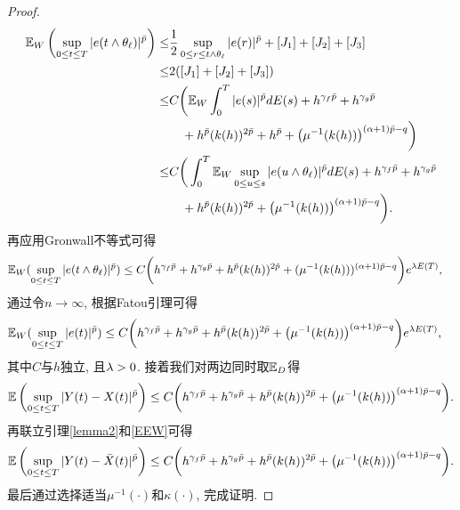 \begin{proof}
\begin{align*}
    \mathbb{E}_W\left(\sup_{0\leq t\leq T}|e( t\wedge\theta_{\ell})|^{\bar{p}}\right)\leq& \frac{1}{2}\sup_{0\leq r\leq t\wedge\theta_{\ell}}|e(r)|^{\bar{p}}+[J_1]+[J_2]+[J_3]\\
    \leq&
    2([J_1]+[J_2]+[J_3])\\
    \leq  &
    C\bigg(\mathbb{E}_{W}\int^{T}_{0}|e(s)|^{\bar{p}}dE(s)+h^{\gamma_f\bar{p}}+h^{\gamma_g\bar{p}}\\
    &\quad+h^{\bar{p}}(k(h))^{2\bar{p}}+h^{\bar{p}}+\big(\mu^{-1}(k(h))\big)^{(\alpha+1)\bar{p}-q}\bigg)\\
    \leq &
    C\bigg(\int^{T}_{0}\mathbb{E}_{W}\sup_{0\leq u\leq s}|e(u\wedge\theta_{\ell} )|^{\bar{p}}dE(s)+h^{\gamma_f\bar{p}}+h^{\gamma_g\bar{p}}\\
    &\quad+h^{\bar{p}}(k(h))^{2\bar{p}}+\big(\mu^{-1}(k(h))\big)^{(\alpha+1)\bar{p}-q}\bigg).
\end{align*}
再应用Gronwall不等式可得
\begin{align*}
    \mathbb{E}_W(\sup_{0\leq t\leq T}|e( t\wedge\theta_{\ell})|^{\bar{p}})
    &\leq 
    C\bigg(h^{\gamma_f\bar{p}}+h^{\gamma_g\bar{p}}
    +h^{\bar{p}}(k(h))^{2\bar{p}}+(\mu^{-1}(k(h)))^{(\alpha+1)\bar{p}-q}\bigg)e^{\lambda E(T)},
\end{align*}
通过令$n\to \infty$, 根据Fatou引理可得
\begin{align*}
    \mathbb{E}_W(\sup_{0\leq t\leq T}|e(t)|^{\bar{p}})
    &\leq 
    C\bigg(h^{\gamma_f\bar{p}}+h^{\gamma_g\bar{p}}
    +h^{\bar{p}}(k(h))^{2\bar{p}}+\big(\mu^{-1}(k(h))\big)^{(\alpha+1)\bar{p}-q}\bigg)e^{\lambda E(T)},
\end{align*}
其中$C$与$h$独立, 且$\lambda > 0$. 接着我们对两边同时取$\mathbb{E}_D$得
 \begin{align}
     \label{EEW}
    \mathbb{E}\left( \sup_{0\leq t\leq T}|Y(t)-X(t)|^{\bar{p}}\right)\leq C\bigg(h^{\gamma_f\bar{p}}+h^{\gamma_g\bar{p}}
    +h^{\bar{p}}(k(h))^{2\bar{p}}+\big(\mu^{-1}(k(h))\big)^{(\alpha+1)\bar{p}-q}\bigg).
\end{align}
再联立引理\ref{lemma2}和\eqref{EEW}可得
\begin{align*}
    \mathbb{E}\left( \sup_{0\leq t\leq T}|Y(t)-\bar{X}(t)|^{\bar{p}}\right)\leq C\bigg(h^{\gamma_f\bar{p}}+h^{\gamma_g\bar{p}}
    +h^{\bar{p}}(k(h))^{2\bar{p}}+\big(\mu^{-1}(k(h))\big)^{(\alpha+1)\bar{p}-q}\bigg).
\end{align*}
最后通过选择适当$\mu^{-1}(\cdot)$和$\kappa(\cdot)$, 完成证明.
\end{proof}

